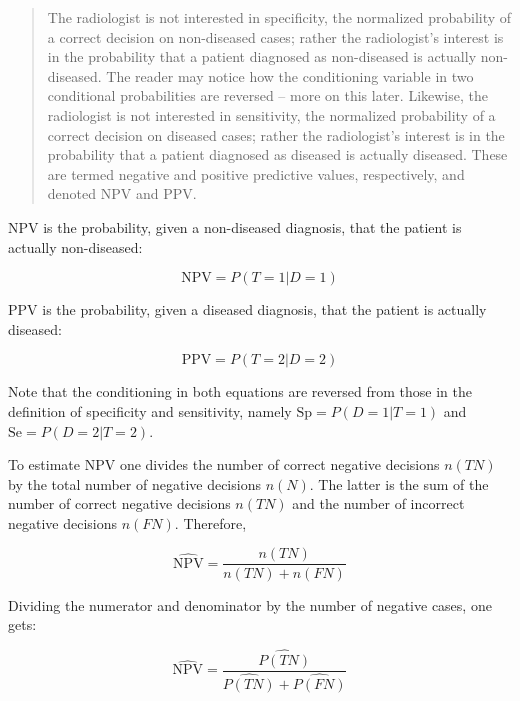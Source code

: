 \documentclass[
]{book}
\begin{document}
\begin{quote}
The radiologist is not interested in specificity, the normalized probability of a correct decision on non-diseased cases; rather the radiologist's interest is in the probability that a patient diagnosed as non-diseased is actually non-diseased. The reader may notice how the conditioning variable in two conditional probabilities are reversed -- more on this later. Likewise, the radiologist is not interested in sensitivity, the normalized probability of a correct decision on diseased cases; rather the radiologist's interest is in the probability that a patient diagnosed as diseased is actually diseased. These are termed negative and positive predictive values, respectively, and denoted \(\text{NPV}\) and \(\text{PPV}\).
\end{quote}

\(\text{NPV}\) is the probability, given a non-diseased diagnosis, that the patient is actually non-diseased:

\begin{equation} 
\text{NPV} = P(T=1|D=1)
\label{eq:binary-task-npv}
\end{equation}

\(\text{PPV}\) is the probability, given a diseased diagnosis, that the patient is actually diseased:

\begin{equation} 
\text{PPV} = P(T=2|D=2)
\label{eq:binary-task-ppv}
\end{equation}

Note that the conditioning in both equations are reversed from those in the definition of specificity and sensitivity, namely \(\text{Sp}=P(D=1|T=1)\) and \(\text{Se}=P(D=2|T=2)\).

To estimate \(\text{NPV}\) one divides the number of correct negative decisions \(n(TN)\) by the total number of negative decisions \(n(N)\). The latter is the sum of the number of correct negative decisions \(n(TN)\) and the number of incorrect negative decisions \(n(FN)\). Therefore,

\begin{equation} 
\widehat{\text{NPV}}=\frac{n(TN)}{n(TN)+n(FN)}
\label{eq:binary-task-npv2}
\end{equation}

Dividing the numerator and denominator by the number of negative cases, one gets:

\begin{equation} 
\widehat{\text{NPV}}=\frac{\widehat{P(TN)}}{\widehat{P(TN)}+\widehat{P(FN)}}
\label{eq:binary-task-npv3}
\end{equation}
\end{document}
